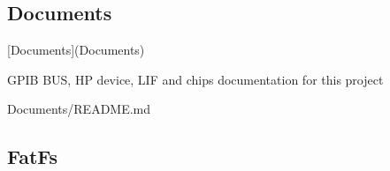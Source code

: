 \subsection*{Documents}


\begin{DoxyItemize}
\item \mbox{[}Documents\mbox{]}(Documents)
\item G\+P\+IB B\+US, HP device, L\+IF and chips documentation for this project
\begin{DoxyItemize}
\item Documents/\+R\+E\+A\+D\+ME.md
\end{DoxyItemize}
\end{DoxyItemize}

\subsection*{Fat\+Fs}


